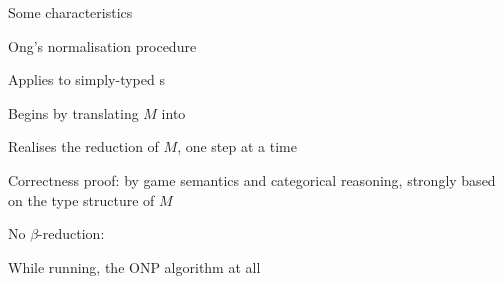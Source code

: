 \documentclass[12pt,fleqn,landscape]{article}
\begin{document}

\begin{slide}{Some characteristics}



Ong's normalisation procedure 
\vair

\bi

\item Applies to simply-typed {\lexp}s
\vair

\item Begins by translating $M$ into 
\vair

\item Realises the  reduction of $M$, one step at a time
\vair

\item Correctness proof:  by game semantics and categorical reasoning,
strongly based on the type structure of $M$ \ei
\vair

\vair\vair

 \hfill No  $\beta$-reduction:  
\vair\vair

While running, the ONP algorithm   at all
 
 
\vair\vair\vair

\bc {}
\ec

\end{slide}


\end{document}
